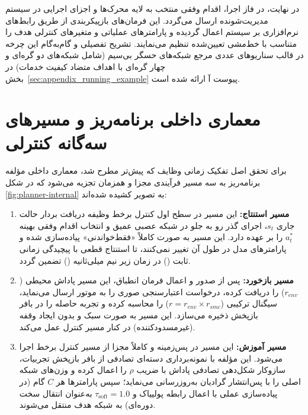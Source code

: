 \documentclass[oneside,openany,phd]{TMU-Thesis}
\begin{document}
در نهایت، در فاز اجرا، اقدام وفقی منتخب به لایه محرک‌ها و اجزای اجرایی در سیستم مدیریت‌شونده ارسال می‌گردد. این فرمان‌های بازپیکربندی از طریق رابط‌های نرم‌افزاری بر سیستم اعمال گردیده و پارامترهای عملیاتی و متغیرهای کنترلی هدف را متناسب با خط‌مشی تعیین‌شده تنظیم می‌نمایند. تشریح تفصیلی و گام‌به‌گام این چرخه در قالب سناریوهای عددی مرجع شبکه‌های حسگر بی‌سیم (شامل شبکه‌های دو گره‌ای و چهار گره‌ای با اهداف متضاد کیفیت خدمات) در بخش~\ref{sec:appendix_running_example} پیوست آ ارائه شده است.

\section{معماری داخلی برنامه‌ریز و مسیرهای سه‌گانه کنترلی}
\label{sec:internal-arch}

برای تحقق اصل تفکیک زمانی وظایف که پیش‌تر مطرح شد، معماری داخلی مؤلفه برنامه‌ریز  به سه مسیر فرآیندی مجزا و همزمان تجزیه می‌شود که در شکل \ref{fig:planner-internal} به تصویر کشیده شده‌اند:

\begin{enumerate}
  \item \textbf{مسیر استنتاج:} این مسیر در سطح اول کنترل برخط وظیفه دریافت بردار حالت جاری $s_t$، اجرای گذر رو به جلو در شبکه عصبی عمیق و انتخاب اقدام وفقی بهینه $a_t^*$ را بر عهده دارد. این مسیر به صورت کاملاً «فقط‌خواندنی» پیاده‌سازی شده و پارامترهای مدل در طول آن تغییر نمی‌کنند، تا استنتاج قطعی با پیچیدگی زمانی ثابت () در زمان زیر نیم میلی‌ثانیه () تضمین گردد.
  \item \textbf{مسیر بازخورد:} پس از صدور و اعمال فرمان انطباق، این مسیر پاداش محیطی ($r_{env}$) را دریافت کرده، درخواست اعتبارسنجی صوری را به موتور  ارسال می‌نماید، سیگنال ترکیبی ($r = r_{env} \times r_{smc}$) را محاسبه کرده و تجربه حاصله را در بافر بازپخش ذخیره می‌سازد. این مسیر به صورت سبک و بدون ایجاد وقفه (غیرمسدودکننده) در کنار مسیر کنترل عمل می‌کند.
  \item \textbf{مسیر آموزش:} این مسیر در پس‌زمینه و کاملاً مجزا از مسیر کنترل برخط اجرا می‌شود. این مؤلفه با نمونه‌برداری دسته‌ای تصادفی از بافر بازپخش تجربیات، سازوکار شکل‌دهی تصادفی پاداش با ضریب $\rho$ را اعمال کرده و وزن‌های شبکه اصلی را با پس‌انتشار گرادیان به‌روزرسانی می‌نماید؛ سپس پارامترها هر $C$ گام (در پیاده‌سازی عملی با اعمال رابطه پولییاک و $\tau_{\text{soft}} = 1.0$ به‌عنوان انتقال سخت دوره‌ای) به شبکه هدف منتقل می‌شوند.
\end{enumerate}
\end{document}
